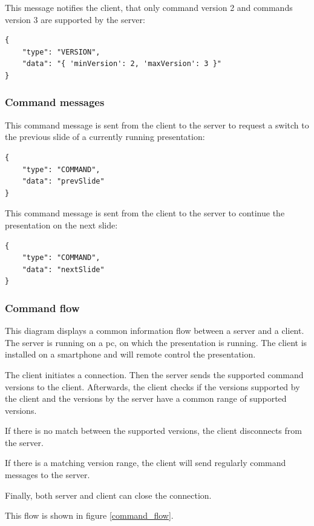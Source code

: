\documentclass{article}
\begin{document}
This message notifies the client, that only command version 2 and commands version 3 are supported by the server:

\begin{verbatim}
{
    "type": "VERSION",
    "data": "{ 'minVersion': 2, 'maxVersion': 3 }"
}
\end{verbatim}

\subsubsection{Command messages}

This command message is sent from the client to the server to request a switch to the previous slide of a currently running presentation:

\begin{verbatim}
{
    "type": "COMMAND",
    "data": "prevSlide"
}
\end{verbatim}

This command message is sent from the client to the server to continue the presentation on the next slide:

\begin{verbatim}
{
    "type": "COMMAND",
    "data": "nextSlide"
}
\end{verbatim}

\subsubsection{Command flow}

This diagram displays a common information flow between a server and a client.\\
The server is running on a pc, on which the presentation is running. The client is installed on a smartphone and will remote control the presentation.

The client initiates a connection. Then the server sends the supported command versions to the client. Afterwards, the client checks if the versions supported by the client and the versions by the server have a common range of supported versions.

If there is no match between the supported versions, the client disconnects from the server.

If there is a matching version range, the client will send regularly command messages to the server.

Finally, both server and client can close the connection.

This flow is shown in figure \ref{command_flow}.
\end{document}
